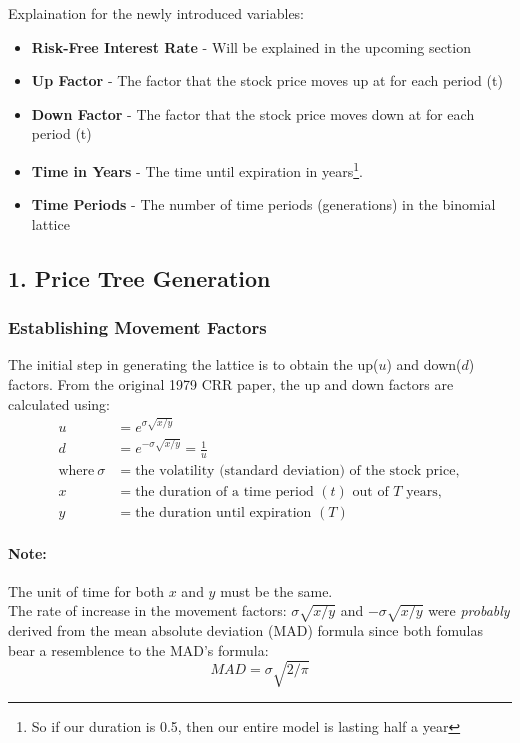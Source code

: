 \documentclass[12pt, letterpaper]{article}\usepackage{float}
\begin{document}
\bigskip

Explaination for the newly introduced variables:
\begin{itemize}[label={}]
  \item \textbf{Risk-Free Interest Rate} - Will be explained in the upcoming section
  \item \textbf{Up Factor} - The factor that the stock price moves up at for each period (t)
  \item \textbf{Down Factor} - The factor that the stock price moves down at for each period (t)
  \item \textbf{Time in Years} - The time until expiration in years\footnote{So if our duration is 0.5, then our entire model is lasting half a year}.
  \item \textbf{Time Periods} - The number of time periods (generations) in the binomial lattice
\end{itemize}

\pagebreak
\subsection*{1. Price Tree Generation}
\subsubsection*{Establishing Movement Factors} \label{establishing movement factors}
The initial step in generating the lattice is to obtain the up(${u}$) and down(${d}$) factors. From the original 1979 CRR paper, the up and down factors are calculated using\cite{bopmwikipedia, crrpaper}:
\begin{align*}
    u &= e^{\sigma\sqrt{x/y}} \\
    d &= e^{-\sigma\sqrt{x/y}} = \frac{1}{u} \\
    \text{where}~\sigma &= \text{the volatility (standard deviation) of the stock price}, \\
    x &= \text{the duration of a time period ${(t)}$ out of ${T}$ years}, \\
    y &= \text{the duration until expiration ${(T)}$}
\end{align*}
\paragraph{Note:} The unit of time for both ${x}$ and ${y}$ must be the same. \\

\bigskip
The rate of increase in the movement factors: ${\sigma\sqrt{x/y}}$ and ${-\sigma\sqrt{x/y}}$ were \textit{probably} derived from the mean absolute deviation (MAD) formula since both fomulas bear a resemblence to the MAD's formula\cite{madwikipedia}:
\begin{equation*}
  MAD = \sigma\sqrt{2/\pi}
\end{equation*}
\end{document}
